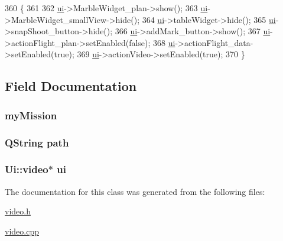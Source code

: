 \begin{DoxyCode}
360 \{
361 
362     \hyperlink{a00015_a4f4e978b71511ee6fcb91ef1a4e3c17c}{ui}->MarbleWidget\_plan->show();
363     \hyperlink{a00015_a4f4e978b71511ee6fcb91ef1a4e3c17c}{ui}->MarbleWidget\_smallView->hide();
364     \hyperlink{a00015_a4f4e978b71511ee6fcb91ef1a4e3c17c}{ui}->tableWidget->hide();
365     \hyperlink{a00015_a4f4e978b71511ee6fcb91ef1a4e3c17c}{ui}->snapShoot\_button->hide();
366     \hyperlink{a00015_a4f4e978b71511ee6fcb91ef1a4e3c17c}{ui}->addMark\_button->show();
367     \hyperlink{a00015_a4f4e978b71511ee6fcb91ef1a4e3c17c}{ui}->actionFlight\_plan->setEnabled(\textcolor{keyword}{false});
368     \hyperlink{a00015_a4f4e978b71511ee6fcb91ef1a4e3c17c}{ui}->actionFlight\_data->setEnabled(\textcolor{keyword}{true});
369     \hyperlink{a00015_a4f4e978b71511ee6fcb91ef1a4e3c17c}{ui}->actionVideo->setEnabled(\textcolor{keyword}{true});
370 \}
\end{DoxyCode}


\subsection{Field Documentation}
\hypertarget{a00015_a8bd377d858dd541faf8108389a13e5ed}{
\subsubsection[{my\-Mission}]{ my\-Mission\hspace{0.3cm}{\ttfamily [private]}}}\label{a00015_a8bd377d858dd541faf8108389a13e5ed}
\hypertarget{a00015_a34b772573db9a14b1acb61b24709ae73}{
\subsubsection[{path}]{\setlength{\rightskip}{0pt plus 5cm}Q\-String path\hspace{0.3cm}{\ttfamily [private]}}}\label{a00015_a34b772573db9a14b1acb61b24709ae73}
\hypertarget{a00015_a4f4e978b71511ee6fcb91ef1a4e3c17c}{
\subsubsection[{ui}]{\setlength{\rightskip}{0pt plus 5cm}Ui\-::video$\ast$ ui\hspace{0.3cm}{\ttfamily [private]}}}\label{a00015_a4f4e978b71511ee6fcb91ef1a4e3c17c}


The documentation for this class was generated from the following files\-:\begin{DoxyCompactItemize}
\item 
\hyperlink{a00043}{video.\-h}\item 
\hyperlink{a00042}{video.\-cpp}\end{DoxyCompactItemize}
